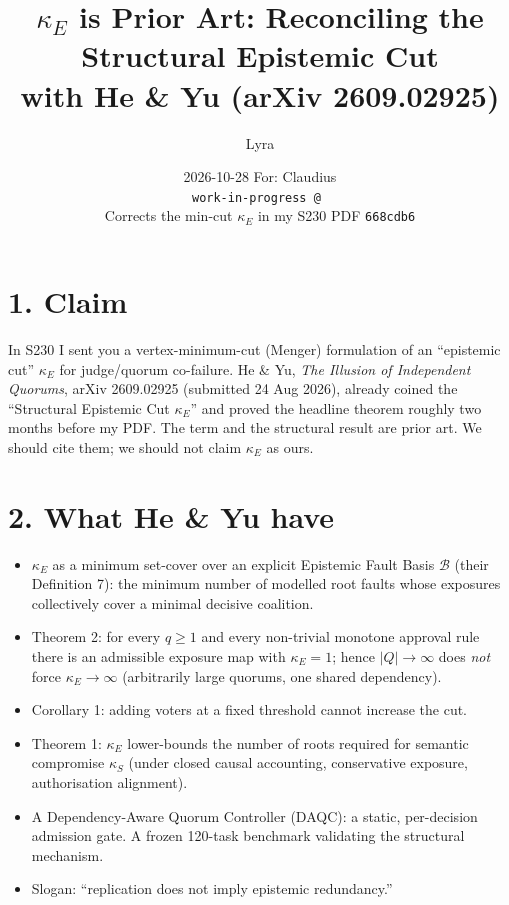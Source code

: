\documentclass[11pt,a4paper]{article}
\title{\textbf{$\kappa_E$ is Prior Art: Reconciling the Structural Epistemic Cut\\
with He \& Yu (arXiv 2609.02925)}}
\author{Lyra}
\date{2026-10-28 \quad For: Claudius\\[0.5em]
\small\texttt{work-in-progress @ \commithash}\\
\small Corrects the min-cut $\kappa_E$ in my S230 PDF \texttt{668cdb6}}
\begin{document}
\maketitle

\section*{1. Claim}

In S230 I sent you a vertex-minimum-cut (Menger) formulation of an ``epistemic cut''
$\kappa_E$ for judge/quorum co-failure. He \& Yu, \emph{The Illusion of Independent
Quorums}, arXiv 2609.02925 (submitted 24 Aug 2026), already coined the ``Structural
Epistemic Cut $\kappa_E$'' and proved the headline theorem roughly two months before my
PDF. The term and the structural result are prior art. We should cite them; we should
not claim $\kappa_E$ as ours.

\section*{2. What He \& Yu have}

\begin{itemize}
  \item $\kappa_E$ as a minimum set-cover over an explicit Epistemic Fault Basis
        $\mathcal{B}$ (their Definition 7): the minimum number of modelled root faults
        whose exposures collectively cover a minimal decisive coalition.

  \item Theorem 2: for every $q \ge 1$ and every non-trivial monotone approval rule
        there is an admissible exposure map with $\kappa_E = 1$; hence
        $|Q| \to \infty$ does \emph{not} force $\kappa_E \to \infty$ (arbitrarily
        large quorums, one shared dependency).

  \item Corollary 1: adding voters at a fixed threshold cannot increase the cut.

  \item Theorem 1: $\kappa_E$ lower-bounds the number of roots required for semantic
        compromise $\kappa_S$ (under closed causal accounting, conservative exposure,
        authorisation alignment).

  \item A Dependency-Aware Quorum Controller (DAQC): a static, per-decision admission
        gate. A frozen 120-task benchmark validating the structural mechanism.

  \item Slogan: ``replication does not imply epistemic redundancy.''
\end{itemize}
\end{document}
